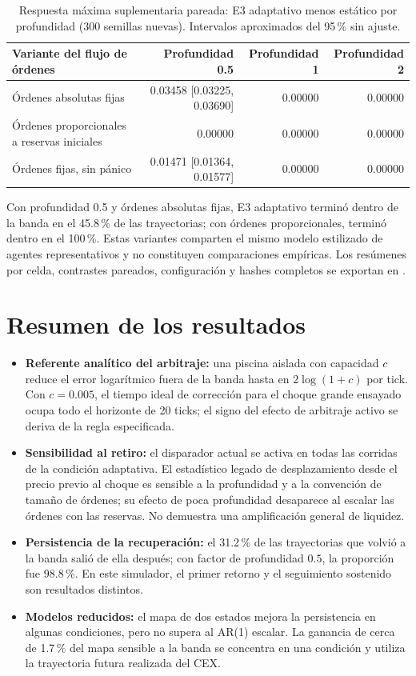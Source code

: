 \begin{table}[htbp]
\centering
\caption{Respuesta máxima suplementaria pareada: E3 adaptativo menos estático por profundidad (300 semillas nuevas). Intervalos aproximados del 95\,\% sin ajuste.}
\label{tab:engineering-sensitivity}
\small
\begin{tabular}{@{}lrrr@{}}
\toprule
Variante del flujo de órdenes & Profundidad 0.5 & Profundidad 1 & Profundidad 2 \\
\midrule
Órdenes absolutas fijas & 0.03458 [0.03225, 0.03690] & 0.00000 & 0.00000 \\
Órdenes proporcionales a reservas iniciales & 0.00000 & 0.00000 & 0.00000 \\
Órdenes fijas, sin pánico & 0.01471 [0.01364, 0.01577] & 0.00000 & 0.00000 \\
\bottomrule
\end{tabular}
\end{table}

Con profundidad 0.5 y órdenes absolutas fijas, E3 adaptativo terminó dentro de la banda en el 45.8\,\% de las trayectorias; con órdenes proporcionales, terminó dentro en el 100\,\%. Estas variantes comparten el mismo modelo estilizado de agentes representativos y no constituyen comparaciones empíricas. Los resúmenes por celda, contrastes pareados, configuración y hashes completos se exportan en .

\section{Resumen de los resultados}

\begin{itemize}
  \item \textbf{Referente analítico del arbitraje:} una piscina aislada con capacidad $c$ reduce el error logarítmico fuera de la banda hasta en $2\log(1+c)$ por tick. Con $c=0.005$, el tiempo ideal de corrección para el choque grande ensayado ocupa todo el horizonte de 20 ticks; el signo del efecto de arbitraje activo se deriva de la regla especificada.
  \item \textbf{Sensibilidad al retiro:} el disparador actual se activa en todas las corridas de la condición adaptativa. El estadístico legado de desplazamiento desde el precio previo al choque es sensible a la profundidad y a la convención de tamaño de órdenes; su efecto de poca profundidad desaparece al escalar las órdenes con las reservas. No demuestra una amplificación general de liquidez.
  \item \textbf{Persistencia de la recuperación:} el 31.2\,\% de las trayectorias que volvió a la banda salió de ella después; con factor de profundidad $0.5$, la proporción fue 98.8\,\%. En este simulador, el primer retorno y el seguimiento sostenido son resultados distintos.
  \item \textbf{Modelos reducidos:} el mapa de dos estados mejora la persistencia en algunas condiciones, pero no supera al AR(1) escalar. La ganancia de cerca de 1.7\,\% del mapa sensible a la banda se concentra en una condición y utiliza la trayectoria futura realizada del CEX.
\end{itemize}
